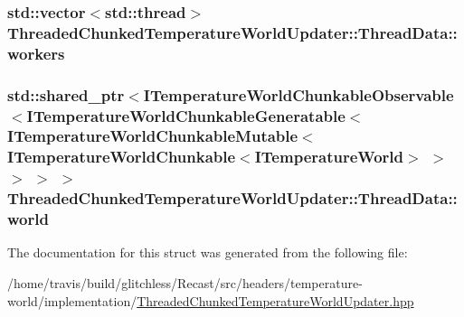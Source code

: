 \hypertarget{struct_threaded_chunked_temperature_world_updater_1_1_thread_data_a9007df155da319c2c0d22950a32151e1}{
\subsubsection[{workers}]{\setlength{\rightskip}{0pt plus 5cm}std\-::vector$<$std\-::thread$>$ Threaded\-Chunked\-Temperature\-World\-Updater\-::\-Thread\-Data\-::workers}}\label{struct_threaded_chunked_temperature_world_updater_1_1_thread_data_a9007df155da319c2c0d22950a32151e1}
\hypertarget{struct_threaded_chunked_temperature_world_updater_1_1_thread_data_acc751ecf3ebda6bb89a20917380453de}{
\subsubsection[{world}]{\setlength{\rightskip}{0pt plus 5cm}std\-::shared\-\_\-ptr$<${\bf I\-Temperature\-World\-Chunkable\-Observable}$<${\bf I\-Temperature\-World\-Chunkable\-Generatable}$<${\bf I\-Temperature\-World\-Chunkable\-Mutable}$<${\bf I\-Temperature\-World\-Chunkable}$<${\bf I\-Temperature\-World}$>$ $>$ $>$ $>$ $>$ Threaded\-Chunked\-Temperature\-World\-Updater\-::\-Thread\-Data\-::world}}\label{struct_threaded_chunked_temperature_world_updater_1_1_thread_data_acc751ecf3ebda6bb89a20917380453de}


The documentation for this struct was generated from the following file\-:\begin{DoxyCompactItemize}
\item 
/home/travis/build/glitchless/\-Recast/src/headers/temperature-\/world/implementation/\hyperlink{_threaded_chunked_temperature_world_updater_8hpp}{Threaded\-Chunked\-Temperature\-World\-Updater.\-hpp}\end{DoxyCompactItemize}
